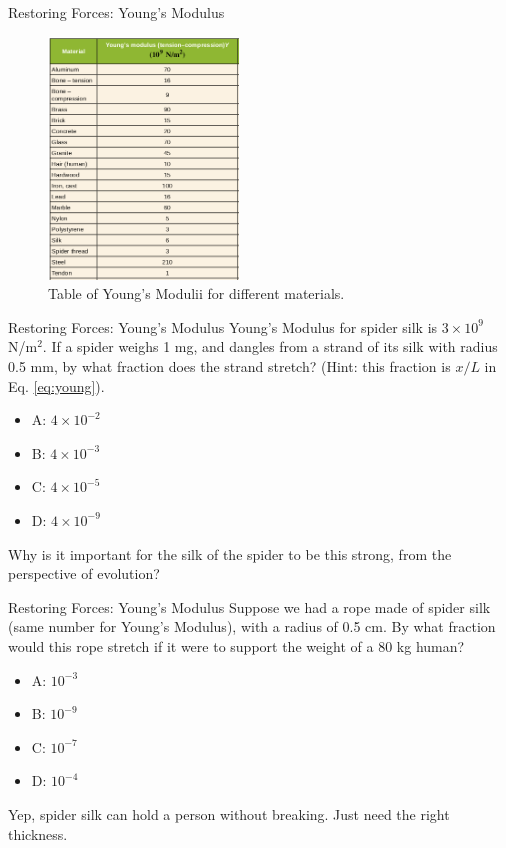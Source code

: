 \documentclass{beamer}
\begin{document}
\begin{frame}{Restoring Forces: Young's Modulus}
\begin{figure}
\centering
\includegraphics[width=0.45\textwidth]{figures/young.png}
\caption{\label{fig:young} Table of Young's Modulii for different materials.}
\end{figure}
\end{frame}

\begin{frame}{Restoring Forces: Young's Modulus}
Young's Modulus for spider silk is $3 \times 10^9$ N/m$^2$.  If a spider weighs 1 mg, and dangles from a strand of its silk with radius 0.5 mm, by what fraction does the strand stretch?  (Hint: this fraction is $x/L$ in Eq. \ref{eq:young}).
\begin{itemize}
\item A: $4 \times 10^{-2}$
\item B: $4 \times 10^{-3}$
\item C: $4 \times 10^{-5}$
\item D: $4 \times 10^{-9}$
\end{itemize}
Why is it important for the silk of the spider to be this strong, from the perspective of evolution?
\end{frame}

\begin{frame}{Restoring Forces: Young's Modulus}
Suppose we had a rope made of spider silk (same number for Young's Modulus), with a radius of 0.5 cm.  By what fraction would this rope stretch if it were to support the weight of a 80 kg human?
\begin{itemize}
\item A: $10^{-3}$
\item B: $10^{-9}$
\item C: $10^{-7}$
\item D: $10^{-4}$
\end{itemize}
Yep, spider silk can hold a person without breaking.  Just need the right thickness.
\end{frame}
\end{document}
